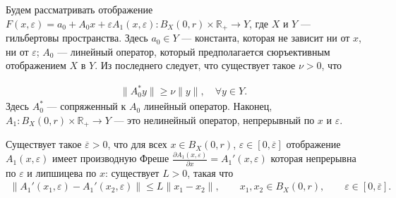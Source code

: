 \documentclass[../main.tex]{subfiles}
\begin{document}
Будем рассматривать отображение $F(x, \varepsilon) = a_0 + A_0x + \varepsilon A_1(x,\varepsilon): B_X(0, r) \times \mathbb{R}_+ \rightarrow Y$, где $X$ и $Y$ --- гильбертовы пространства.
Здесь $a_0 \in Y$ --- константа, которая не зависит ни от $x$, ни от $\varepsilon$; $A_0$ --- линейный оператор, который предполагается сюръективным отображением $X$ в $Y$. 
Из последнего следует, что существует такое $\nu > 0$, что

\begin{gather}\label{regular}
 \| A_0^*y\| \geqslant \nu \|y\|, \quad \forall y \in Y.
\end{gather}
Здесь $A_0^* $ --- сопряженный к $A_0$ линейный оператор.
Наконец, $A_1: B_X(0, r) \times \mathbb{R}_+ \to Y $ --- это нелинейный оператор, непрерывный по $x$ и $\varepsilon$.
\begin{assumption}\label{as:derivative_of_A1}
 Существует такое $\overline{\varepsilon} > 0$, что для всех $x \in B_X(0,r)$, $\varepsilon \in [0, \overline{\varepsilon}]$ отображение $A_1(x, \varepsilon)$ имеет производную Фреше $\frac{\partial A_1(x, \varepsilon)}{\partial x} = A_1'(x, \varepsilon)$ которая непрерывна по $\varepsilon$ и липшицева по $x$: существует $L>0$, такая что
 \begin{gather*}
 \|A_1'(x_1,\varepsilon) - A_1'(x_2,\varepsilon) \| \leqslant L\|x_1-x_2\|, \qquad x_1, x_2 \in B_X(0,r), \qquad \varepsilon \in [0, \overline{\varepsilon}].
 \end{gather*}
\end{assumption}
\end{document}
